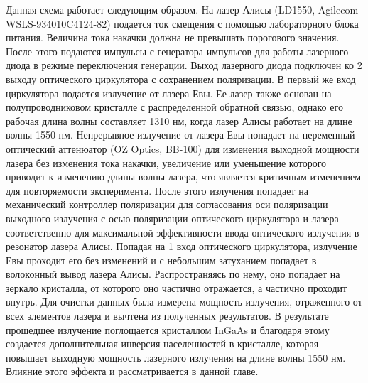 Данная схема работает следующим образом. На лазер Алисы (LD1550, Agilecom WSLS-934010C4124-82) подается ток смещения с помощью лабораторного блока питания. Величина тока накачки должна не превышать порогового значения. После этого подаются импульсы с генератора импульсов для работы лазерного диода в режиме переключения генерации. Выход лазерного диода подключен ко 2 выходу оптического циркулятора с сохранением поляризации. В первый же вход циркулятора подается излучение от лазера Евы. Ее лазер также основан на полупроводниковом кристалле с распределенной обратной связью, однако его рабочая длина волны составляет 1310 нм, когда лазер Алисы работает на длине волны 1550 нм. Непрерывное излучение от лазера Евы попадает на переменный оптический аттенюатор (OZ Optics, BB-100) для изменения выходной мощности лазера без изменения тока накачки, увеличение или уменьшение которого приводит к изменению длины волны лазера, что является критичным изменением для повторяемости эксперимента. После этого излучения попадает на механический контроллер поляризации для согласования оси поляризации выходного излучения с осью поляризации оптического циркулятора и лазера соответственно для максимальной эффективности ввода оптического излучения в резонатор лазера Алисы. Попадая на 1 вход оптического циркулятора, излучение Евы проходит его без изменений и с небольшим затуханием попадает в волоконный вывод лазера Алисы. Распространяясь по нему, оно попадает на зеркало кристалла, от которого оно частично отражается, а частично проходит внутрь. Для очистки данных была измерена мощность излучения, отраженного от всех элементов лазера и вычтена из полученных результатов. В результате прошедшее излучение поглощается кристаллом InGaAs и благодаря этому создается дополнительная инверсия населенностей в кристалле, которая повышает выходную мощность лазерного излучения на длине волны 1550 нм. Влияние этого эффекта и рассматривается в данной главе. 

